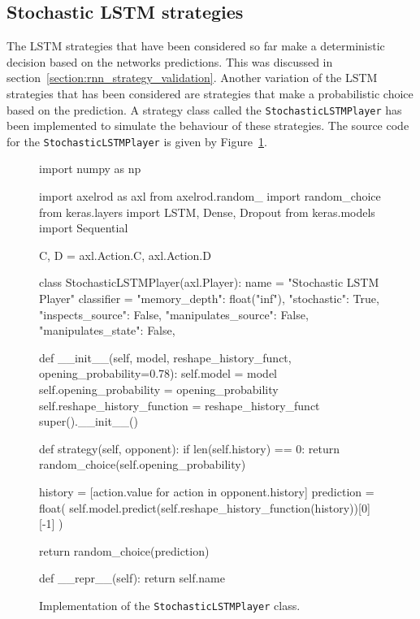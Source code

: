 \subsection{Stochastic LSTM strategies}\label{sec:stochastic-lstm-strategies}

The LSTM strategies that have been considered so far make a deterministic
decision based on the networks predictions. This was discussed in
section~\ref{section:rnn_strategy_validation}. Another variation of the LSTM
strategies that has been considered are strategies that make a probabilistic
choice based on the prediction. A strategy class called the
\texttt{StochasticLSTMPlayer} has been implemented to simulate the
behaviour of these strategies. The source code for the
\texttt{StochasticLSTMPlayer} is given by
Figure~\ref{fig:stochastic_lstm_player_source_code}.

\begin{figure}[!htbp]
\begin{sourcepy}
import numpy as np

import axelrod as axl
from axelrod.random_ import random_choice
from keras.layers import LSTM, Dense, Dropout
from keras.models import Sequential

C, D = axl.Action.C, axl.Action.D


class StochasticLSTMPlayer(axl.Player):
name = "Stochastic LSTM Player"
classifier = {
    "memory_depth": float("inf"),
    "stochastic": True,
    "inspects_source": False,
    "manipulates_source": False,
    "manipulates_state": False,
}

def __init__(self, model, reshape_history_funct, opening_probability=0.78):
    self.model = model
    self.opening_probability = opening_probability
    self.reshape_history_function = reshape_history_funct
    super().__init__()

def strategy(self, opponent):
    if len(self.history) == 0:
        return random_choice(self.opening_probability)

    history = [action.value for action in opponent.history]
    prediction = float(
        self.model.predict(self.reshape_history_function(history))[0][-1]
    )

    return random_choice(prediction)

def __repr__(self):
    return self.name

\end{sourcepy}
\caption{Implementation of the \texttt{StochasticLSTMPlayer} class.}\label{fig:stochastic_lstm_player_source_code}
\end{figure}

